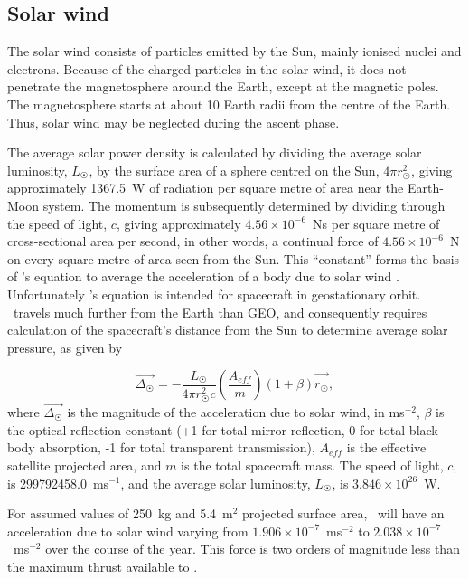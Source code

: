\subsection{Solar wind} \label{sub:Solar-Wind}

The solar wind consists of particles emitted by the Sun, mainly ionised nuclei and electrons. Because of the charged particles in the solar wind, it does not penetrate the magnetosphere around the Earth, except at the magnetic poles. The magnetosphere starts at about 10 Earth radii from the centre of the Earth. Thus, solar wind may be neglected during the ascent phase.

The average solar power density is calculated by dividing the average solar luminosity, $L_\Sun$,  by the surface area of a sphere centred on the Sun, $4\pi r_\Sun^2$, giving approximately 1367.5~W of radiation per square metre of area near the Earth-Moon system. The momentum is subsequently determined by dividing through the speed of light, $c$, giving approximately $4.56\times10^{-6}$~Ns per square metre of cross-sectional area per second, in other words, a continual force of $4.56\times10^{-6}$~N on every square metre of area seen from the Sun. This \enquote{constant} forms the basis of \citeauthor{Chobotov2002}'s equation to average the acceleration of a body due to solar wind \parencite[p. 223]{Chobotov2002}. Unfortunately \citeauthor{Chobotov2002}'s equation is intended for spacecraft in geostationary orbit. \BW\ travels much further from the Earth than GEO, and consequently requires calculation of the spacecraft's distance from the Sun to determine average solar pressure, as given by

\begin{equation}\label{eq:solar-wind}
\vec{\Delta_\Sun} = -\frac{L_\Sun}{4\pi r_\Sun^2c}\left(\frac{A_{eff}}{m}\right)(1+\beta)\vec{\hat{r_\Sun}},
\end{equation}
where $\vec{\Delta_\Sun}$ is the magnitude of the acceleration due to solar wind, in ms$^{-2}$, $\beta$ is the optical reflection constant (+1 for total mirror reflection, 0 for total black body absorption, -1 for total transparent transmission), $A_{eff}$ is the effective satellite projected area, and $m$ is the total spacecraft mass. The speed of light, $c$, is 299792458.0~ms$^{-1}$, and the average solar luminosity, $L_\Sun$, is $3.846\times10^{26}$~W.

For assumed values of 250~kg and 5.4~m$^2$ projected surface area, \BW\ will have an acceleration due to solar wind varying from $1.906\times10^{-7}$~ms$^{-2}$ to $2.038\times10^{-7}$~ms$^{-2}$ over the course of the year. This force is two orders of magnitude less than the maximum thrust available to \BW.

